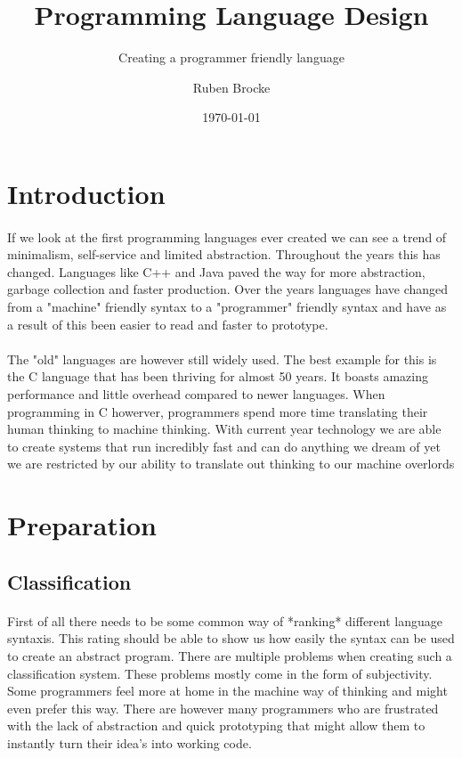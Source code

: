 \documentclass{scrartcl}
\author{Ruben Brocke}
\title{Programming Language Design}
\subtitle{Creating a programmer friendly language}
\date{\today}
\begin{document}
    \pagecolor{yellow!10}
    \maketitle
    \newpage

    \tableofcontents
    \newpage

    \section{Introduction}
    \paragraph{}
    If we look at the first programming languages ever created
    we can see a trend of minimalism, self-service and limited abstraction.
    Throughout the years this has changed. Languages like C++ and Java
    paved the way for more abstraction, garbage collection and faster production.
    Over the years languages have changed from a "machine" friendly syntax
    to a "programmer" friendly syntax and have as a result of this been
    easier to read and faster to prototype.
    \paragraph{}
    The "old" languages are however still widely used. The best example for
    this is the C language that has been thriving for almost 50 years. 
    It boasts amazing performance and little overhead compared to newer languages.
    When programming in C howerver, programmers spend more time translating their
    human thinking to machine thinking. With current year technology we are
    able to create systems that run incredibly fast and can do anything we dream of
    yet we are restricted by our ability to translate out thinking to our machine overlords
    \newpage

    \section{Preparation}
    \subsection{Classification}
    \paragraph{}
    First of all there needs to be some common way of *ranking* different 
    language syntaxis. This rating should be able to show us how easily 
    the syntax can be used to create an abstract program. There are multiple
    problems when creating such a classification system. These problems mostly
    come in the form of subjectivity. Some programmers feel more at home in
    the machine way of thinking and might even prefer this way. There are however
    many programmers who are frustrated with the lack of abstraction and quick
    prototyping that might allow them to instantly turn their idea's into working code.
\end{document}
